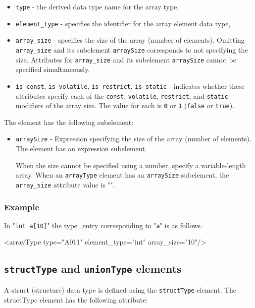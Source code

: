 \begin{itemize}
\item {\tt type} - the derived data type name for the array type,
\item {\tt element\_type} - specifies the identifier for the array element data type,
\item {\tt array\_size} - specifies the size of the array (number of elements). Omitting {\tt array\_size} and its subelement {\tt arraySize} corresponds to not specifying the size. Attributes for {\tt array\_size} and its subelement {\tt arraySize} cannot be specified simultaneously. 
\item {\tt is\_const}, {\tt is\_volatile}, {\tt is\_restrict}, {\tt is\_static} - indicates whether these attributes specify each of the {\tt const}, {\tt volatile}, {\tt restrict}, and {\tt static} modifiers of the array size. The value for each is {\tt 0} or {\tt 1} ({\tt false} or {\tt true}).
\end{itemize}

The element has the following subelement:

\begin{itemize}
\item {\tt arraySize} - Expression specifying the size of the array (number of elements). The element has an expression subelement.

      When the size cannot be specified using a number, specify a variable-length array. When an {\tt arrayType} element has an {\tt arraySize} subelement, the {\tt array\_size} attribute value is "{\tt *}". 
\end{itemize}

\subsubsection*{Example}

In "{\tt int a[10]}" the type\_entry corresponding to "{\tt a}" is as follows.
\vspace{2mm}

\begin{XcodeMLExample}
<arrayType type="A011" element_type="int" array_size="10"/>
\end{XcodeMLExample}


\subsection{ {\tt structType} and {\tt unionType} elements}

A struct (structure) data type is defined using the {\tt structType} element. The structType element has the following attribute:

